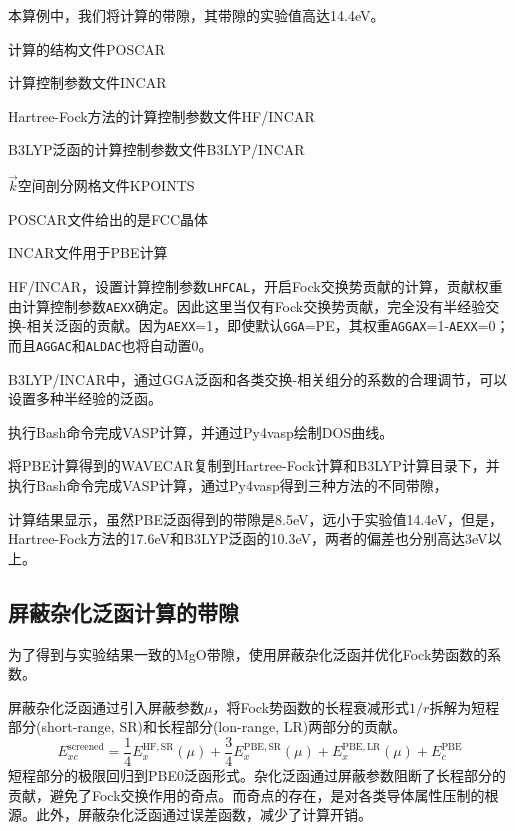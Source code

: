 本算例中，我们将计算的带隙，其带隙的实验值高达\textrm{14.4eV}。

计算的结构文件\textrm{POSCAR}

计算控制参数文件\textrm{INCAR}

\textrm{Hartree-Fock}方法的计算控制参数文件\textrm{HF/INCAR}

\textrm{B3LYP}泛函的计算控制参数文件\textrm{B3LYP/INCAR}

$\vec k$空间剖分网格文件\textrm{KPOINTS}

\textrm{POSCAR}文件给出的是\textrm{FCC}晶体

\textrm{INCAR}文件用于\textrm{PBE}计算

\textrm{HF/INCAR}，设置计算控制参数\texttt{LHFCAL}，开启\textrm{Fock}交换势贡献的计算，贡献权重由计算控制参数\texttt{AEXX}确定。因此这里当仅有\textrm{Fock}交换势贡献，完全没有半经验交换-相关泛函的贡献。因为\texttt{AEXX}=1，即使默认\texttt{GGA}=\textrm{PE}，其权重\texttt{AGGAX}=1-\texttt{AEXX}=0；而且\texttt{AGGAC}和\texttt{ALDAC}也将自动置0。

\textrm{B3LYP/INCAR}中，通过\textrm{GGA}泛函和各类交换-相关组分的系数的合理调节，可以设置多种半经验的泛函。

执行\textrm{Bash}命令完成\textrm{VASP}计算，并通过\textrm{Py4vasp}绘制\textrm{DOS}曲线。

将\textrm{PBE}计算得到的\textrm{WAVECAR}复制到\textrm{Hartree-Fock}计算和\textrm{B3LYP}计算目录下，并执行\textrm{Bash}命令完成\textrm{VASP}计算，通过\textrm{Py4vasp}得到三种方法的不同带隙，

计算结果显示，虽然\textrm{PBE}泛函得到的带隙是\textrm{8.5eV}，远小于实验值\textrm{14.4eV}，但是，\textrm{Hartree-Fock}方法的\textrm{17.6eV}和\textrm{B3LYP}泛函的\textrm{10.3eV}，两者的偏差也分别高达\textrm{3eV}以上。

\subsection{屏蔽杂化泛函计算的带隙}
为了得到与实验结果一致的\textrm{MgO}带隙，使用屏蔽杂化泛函并优化\textrm{Fock}势函数的系数。

屏蔽杂化泛函通过引入屏蔽参数$\mu$，将\textrm{Fock}势函数的长程衰减形式$1/r$拆解为短程部分\textrm{(short-range, SR)}和长程部分\textrm{(lon-range, LR)}两部分的贡献。
\begin{displaymath}
	E_{xc}^{\mathrm{screened}}=\dfrac14E_{x}^{\mathrm{HF,SR}}(\mu)+\dfrac34E_{x}^{\mathrm{PBE,SR}}(\mu)+E_{x}^{\mathrm{PBE,LR}}(\mu)+E_c^{\mathrm{PBE}}
\end{displaymath}
短程部分的极限回归到\textrm{PBE0}泛函形式。杂化泛函通过屏蔽参数阻断了长程部分的贡献，避免了\textrm{Fock}交换作用的奇点。而奇点的存在，是对各类导体属性压制的根源。此外，屏蔽杂化泛函通过误差函数，减少了计算开销。

